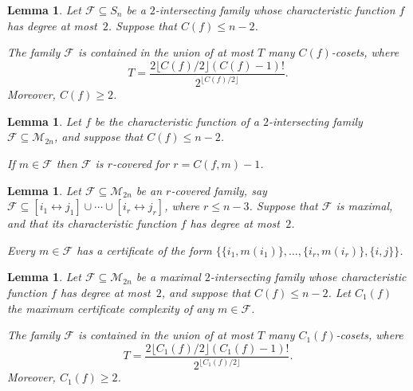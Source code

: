 \documentclass[10pt,a4paper]{article}
\newtheorem{lemma}[theorem]{Lemma}
\theoremstyle{definition}
\providecommand{\dcoset}[2]{[#1 \leftrightarrow #2]}
\providecommand{\cM}{\mathcal{M}}
\begin{document}
\begin{lemma} \label{lem:main-ub-sym}
Let $\mathcal{F} \subseteq S_n$ be a $2$-intersecting family whose characteristic function $f$ has degree at most~$2$. Suppose that $C(f) \leq n-2$.

The family $\mathcal{F}$ is contained in the union of at most $T$ many $C(f)$-cosets, where
\[
 T = \frac{2\lfloor C(f)/2 \rfloor (C(f) - 1)!}{2^{\lfloor C(f)/2 \rfloor}}.
\]
Moreover, $C(f) \geq 2$.
\end{lemma}

\begin{lemma} \label{lem:covering-pms}
Let $f$ be the characteristic function of a $2$-intersecting family $\mathcal{F} \subseteq \cM_{2n}$, and suppose that $C(f) \leq n-2$.

If $m \in \mathcal{F}$ then $\mathcal{F}$ is $r$-covered for $r = C(f,m) - 1$.
\end{lemma}

\begin{lemma} \label{lem:structure-pms}
Let $\mathcal{F} \subseteq \cM_{2n}$ be an $r$-covered family, say $\mathcal{F} \subseteq \dcoset{i_1}{j_1} \cup \cdots \cup \dcoset{i_r}{j_r}$, where $r \leq n-3$. Suppose that $\mathcal{F}$ is maximal, and that its characteristic function $f$ has degree at most~$2$.

Every $m \in \mathcal{F}$ has a certificate of the form $\bigl\{\{i_1,m(i_1)\},\ldots,\{i_r,m(i_r)\},\{i,j\}\bigr\}$.
\end{lemma}

\begin{lemma} \label{lem:main-ub-pms}
Let $\mathcal{F} \subseteq \cM_{2n}$ be a maximal $2$-intersecting family whose characteristic function $f$ has degree at most~$2$, and suppose that $C(f) \leq n-2$. Let $C_1(f)$ the maximum certificate complexity of any $m \in \mathcal{F}$.

The family $\mathcal{F}$ is contained in the union of at most $T$ many $C_1(f)$-cosets, where
\[
 T = \frac{2\lfloor C_1(f)/2 \rfloor (C_1(f) - 1)!}{2^{\lfloor C_1(f)/2 \rfloor}}.
\]
Moreover, $C_1(f) \geq 2$.
\end{lemma}
\end{document}
